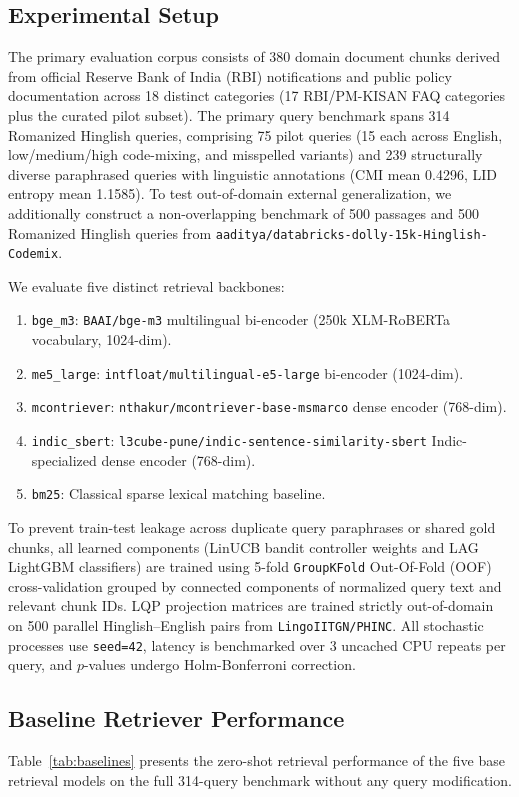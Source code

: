 \documentclass[conference]{IEEEtran}
\begin{document}
\subsection{Experimental Setup}
The primary evaluation corpus consists of 380 domain document chunks derived from official Reserve Bank of India (RBI) notifications and public policy documentation across 18 distinct categories (17 RBI/PM-KISAN FAQ categories plus the curated pilot subset). The primary query benchmark spans 314 Romanized Hinglish queries, comprising 75 pilot queries (15 each across English, low/medium/high code-mixing, and misspelled variants) and 239 structurally diverse paraphrased queries with linguistic annotations (CMI mean 0.4296, LID entropy mean 1.1585). To test out-of-domain external generalization, we additionally construct a non-overlapping benchmark of 500 passages and 500 Romanized Hinglish queries from \texttt{aaditya/databricks-dolly-15k-Hinglish-Codemix}.

We evaluate five distinct retrieval backbones:
\begin{enumerate}
    \item \texttt{bge\_m3}: \texttt{BAAI/bge-m3} multilingual bi-encoder (250k XLM-RoBERTa vocabulary, 1024-dim).
    \item \texttt{me5\_large}: \texttt{intfloat/multilingual-e5-large} bi-encoder (1024-dim).
    \item \texttt{mcontriever}: \texttt{nthakur/mcontriever-base-msmarco} dense encoder (768-dim).
    \item \texttt{indic\_sbert}: \texttt{l3cube-pune/indic-sentence-similarity-sbert} Indic-specialized dense encoder (768-dim).
    \item \texttt{bm25}: Classical sparse lexical matching baseline.
\end{enumerate}

To prevent train-test leakage across duplicate query paraphrases or shared gold chunks, all learned components (LinUCB bandit controller weights and LAG LightGBM classifiers) are trained using 5-fold \texttt{GroupKFold} Out-Of-Fold (OOF) cross-validation grouped by connected components of normalized query text and relevant chunk IDs. LQP projection matrices are trained strictly out-of-domain on 500 parallel Hinglish--English pairs from \texttt{LingoIITGN/PHINC}. All stochastic processes use \texttt{seed=42}, latency is benchmarked over 3 uncached CPU repeats per query, and $p$-values undergo Holm-Bonferroni correction.

\subsection{Baseline Retriever Performance}
Table~\ref{tab:baselines} presents the zero-shot retrieval performance of the five base retrieval models on the full 314-query benchmark without any query modification.
\end{document}
